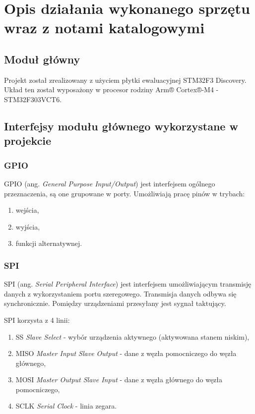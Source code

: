 \documentclass{article}
\begin{document}
\section{Opis działania wykonanego sprzętu wraz z notami katalogowymi}

\subsection{Moduł główny}
Projekt został zrealizowany z użyciem płytki ewaluacyjnej STM32F3 Discovery.
Układ ten został wyposażony w procesor rodziny Arm® Cortex®-M4 - STM32F303VCT6.

\subsection{Interfejsy modułu głównego wykorzystane w projekcie}
\subsubsection{GPIO}
GPIO (ang. \emph{General Purpose Input/Output}) jest interfejsem ogólnego przeznaczenia, są one grupowane w porty.
Umożliwiają pracę pinów w trybach:

\begin{enumerate}
   \item wejścia,
   \item wyjścia,
   \item funkcji alternatywnej.
\end{enumerate}

\subsubsection{SPI}
SPI (ang. \emph{Serial Peripheral Interface}) jest interfejsem umożliwiającym transmisję
danych z wykorzystaniem portu szeregowego. Transmisja danych odbywa się synchronicznie.
Pomiędzy urządzeniami przesyłany jest sygnał taktujący.

SPI korzysta z 4 linii:
\begin{enumerate}
   \item SS \emph{Slave Select} - wybór urządzenia aktywnego (aktywowana stanem niskim),
   \item MISO \emph{Master Input Slave Output} - dane z węzła pomocniczego do węzła głównego,
   \item MOSI \emph{Master Output Slave Input} - dane z węzła głównego do węzła pomocniczego,
   \item SCLK \emph{Serial Clock} - linia zegara.
\end{enumerate}
\end{document}
